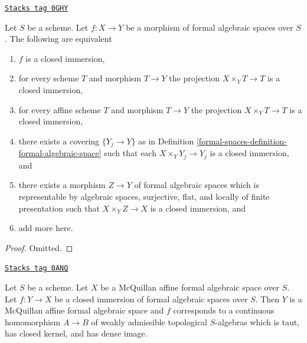 \begin{lemma}
\label{formal-spaces-lemma-characterize-closed-immersion}
\href{https://stacks.math.columbia.edu/tag/0GHY}{\texttt{Stacks tag 0GHY}}

Let $S$ be a scheme. Let $f : X \to Y$ be a morphism of formal algebraic
spaces over $S$. The following are equivalent
\begin{enumerate}
\item $f$ is a closed immersion,
\item for every scheme $T$ and morphism $T \to Y$ the projection
$X \times_Y T \to T$ is a closed immersion,
\item for every affine scheme $T$ and morphism $T \to Y$
the projection $X \times_Y T \to T$ is a closed immersion,
\item there exists a covering $\{Y_j \to Y\}$ as in
Definition \ref{formal-spaces-definition-formal-algebraic-space}
such that each $X \times_Y Y_j \to Y_j$ is a closed immersion, and
\item there exists a morphism $Z \to Y$ of formal algebraic spaces
which is representable by algebraic spaces, surjective, flat, and locally
of finite presentation such that $X \times_Y Z \to X$ is a
closed immersion, and
\item add more here.
\end{enumerate}
\end{lemma}

\begin{proof}
Omitted.
\end{proof}

\begin{lemma}
\label{formal-spaces-lemma-closed-immersion-into-McQuillan}
\href{https://stacks.math.columbia.edu/tag/0ANQ}{\texttt{Stacks tag 0ANQ}}

Let $S$ be a scheme. Let $X$ be a McQuillan affine formal algebraic space
over $S$. Let $f : Y \to X$ be a closed immersion of formal algebraic spaces
over $S$. Then $Y$ is a McQuillan affine formal algebraic space and
$f$ corresponds to a continuous homomorphism $A \to B$ of weakly admissible
topological $S$-algebras which is taut, has closed kernel, and has
dense image.
\end{lemma}

